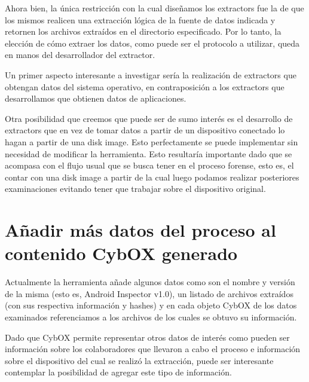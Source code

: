 Ahora bien, la única restricción con la cual diseñamos los extractors fue la de que los mismos realicen una extracción lógica de la fuente de datos indicada y retornen los archivos extraídos en el directorio especificado. Por lo tanto, la elección de cómo extraer los datos, como puede ser el protocolo a utilizar, queda en manos del desarrollador del extractor.

Un primer aspecto interesante a investigar sería la realización de extractors que obtengan datos del sistema operativo, en contraposición a los extractors que desarrollamos que obtienen datos de aplicaciones.

Otra posibilidad que creemos que puede ser de sumo interés es el desarrollo de extractors que en vez de tomar datos a partir de un dispositivo conectado lo hagan a partir de una disk image. Esto perfectamente se puede implementar sin necesidad de modificar la herramienta. Esto resultaría importante dado que se acompasa con el flujo usual que se busca tener en el proceso forense, esto es, el contar con una disk image a partir de la cual luego podamos realizar posteriores examinaciones evitando tener que trabajar sobre el dispositivo original.

\section{Añadir más datos del proceso al contenido CybOX generado}
Actualmente la herramienta añade algunos datos como son el nombre y versión de la misma (esto es, Android Inspector v1.0), un listado de archivos extraídos (con sus respectiva información y hashes) y en cada objeto CybOX de los datos examinados referenciamos a los archivos de los cuales se obtuvo su información.

Dado que CybOX permite representar otros datos de interés como pueden ser información sobre los colaboradores que llevaron a cabo el proceso e información sobre el dispositivo del cual se realizó la extracción, puede ser interesante contemplar la posibilidad de agregar este tipo de información.